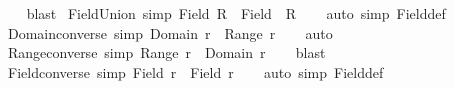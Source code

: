 \begin{isabellebody}
%
\isadelimproof
\ \ %
\endisadelimproof
%
\isatagproof
{}\isamarkupfalse%
\ blast%
\endisatagproof
{\isafoldproof}%
%
\isadelimproof
\isanewline
%
\endisadelimproof
\isanewline
{}\isamarkupfalse%
\ Field{\isacharunderscore}{\kern0pt}Union\ {\isacharbrackleft}{\kern0pt}simp{\isacharbrackright}{\kern0pt}{\isacharcolon}{\kern0pt}\ {\isachardoublequoteopen}Field\ {\isacharparenleft}{\kern0pt}{\isasymUnion}R{\isacharparenright}{\kern0pt}\ {\isacharequal}{\kern0pt}\ {\isasymUnion}{\isacharparenleft}{\kern0pt}Field\ {\isacharbackquote}{\kern0pt}\ R{\isacharparenright}{\kern0pt}{\isachardoublequoteclose}\isanewline
%
\isadelimproof
\ \ %
\endisadelimproof
%
\isatagproof
{}\isamarkupfalse%
\ {\isacharparenleft}{\kern0pt}auto\ simp{\isacharcolon}{\kern0pt}\ Field{\isacharunderscore}{\kern0pt}def{\isacharparenright}{\kern0pt}%
\endisatagproof
{\isafoldproof}%
%
\isadelimproof
\isanewline
%
\endisadelimproof
\isanewline
{}\isamarkupfalse%
\ Domain{\isacharunderscore}{\kern0pt}converse\ {\isacharbrackleft}{\kern0pt}simp{\isacharbrackright}{\kern0pt}{\isacharcolon}{\kern0pt}\ {\isachardoublequoteopen}Domain\ {\isacharparenleft}{\kern0pt}r{\isasyminverse}{\isacharparenright}{\kern0pt}\ {\isacharequal}{\kern0pt}\ Range\ r{\isachardoublequoteclose}\isanewline
%
\isadelimproof
\ \ %
\endisadelimproof
%
\isatagproof
{}\isamarkupfalse%
\ auto%
\endisatagproof
{\isafoldproof}%
%
\isadelimproof
\isanewline
%
\endisadelimproof
\isanewline
{}\isamarkupfalse%
\ Range{\isacharunderscore}{\kern0pt}converse\ {\isacharbrackleft}{\kern0pt}simp{\isacharbrackright}{\kern0pt}{\isacharcolon}{\kern0pt}\ {\isachardoublequoteopen}Range\ {\isacharparenleft}{\kern0pt}r{\isasyminverse}{\isacharparenright}{\kern0pt}\ {\isacharequal}{\kern0pt}\ Domain\ r{\isachardoublequoteclose}\isanewline
%
\isadelimproof
\ \ %
\endisadelimproof
%
\isatagproof
{}\isamarkupfalse%
\ blast%
\endisatagproof
{\isafoldproof}%
%
\isadelimproof
\isanewline
%
\endisadelimproof
\isanewline
{}\isamarkupfalse%
\ Field{\isacharunderscore}{\kern0pt}converse\ {\isacharbrackleft}{\kern0pt}simp{\isacharbrackright}{\kern0pt}{\isacharcolon}{\kern0pt}\ {\isachardoublequoteopen}Field\ {\isacharparenleft}{\kern0pt}r{\isasyminverse}{\isacharparenright}{\kern0pt}\ {\isacharequal}{\kern0pt}\ Field\ r{\isachardoublequoteclose}\isanewline
%
\isadelimproof
\ \ %
\endisadelimproof
%
\isatagproof
{}\isamarkupfalse%
\ {\isacharparenleft}{\kern0pt}auto\ simp{\isacharcolon}{\kern0pt}\ Field{\isacharunderscore}{\kern0pt}def{\isacharparenright}{\kern0pt}%

\end{isabellebody}
